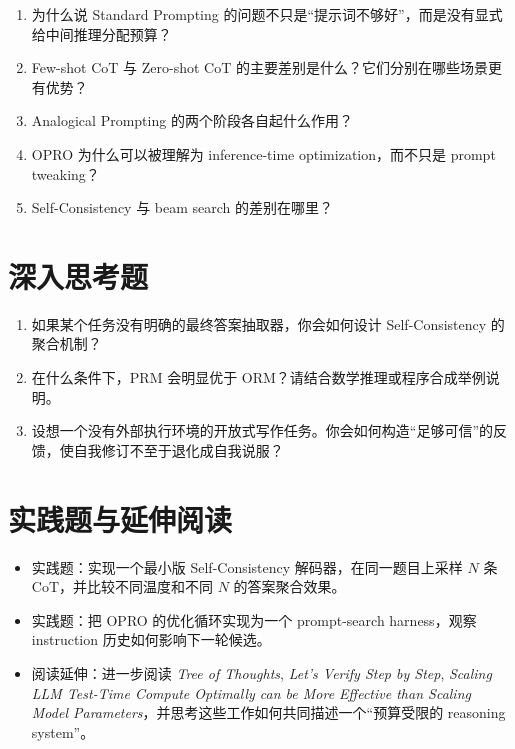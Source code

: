 \documentclass[a4paper]{article}
\begin{document}
\begin{enumerate}
\item 为什么说 Standard Prompting 的问题不只是“提示词不够好”，而是没有显式给中间推理分配预算？
\item Few-shot CoT 与 Zero-shot CoT 的主要差别是什么？它们分别在哪些场景更有优势？
\item Analogical Prompting 的两个阶段各自起什么作用？
\item OPRO 为什么可以被理解为 inference-time optimization，而不只是 prompt tweaking？
\item Self-Consistency 与 beam search 的差别在哪里？
\end{enumerate}

\section{深入思考题}

\begin{enumerate}
\item 如果某个任务没有明确的最终答案抽取器，你会如何设计 Self-Consistency 的聚合机制？
\item 在什么条件下，PRM 会明显优于 ORM？请结合数学推理或程序合成举例说明。
\item 设想一个没有外部执行环境的开放式写作任务。你会如何构造“足够可信”的反馈，使自我修订不至于退化成自我说服？
\end{enumerate}

\section{实践题与延伸阅读}

\begin{itemize}
\item 实践题：实现一个最小版 Self-Consistency 解码器，在同一题目上采样 $N$ 条 CoT，并比较不同温度和不同 $N$ 的答案聚合效果。
\item 实践题：把 OPRO 的优化循环实现为一个 prompt-search harness，观察 instruction 历史如何影响下一轮候选。
\item 阅读延伸：进一步阅读 \emph{Tree of Thoughts}, \emph{Let's Verify Step by Step}, \emph{Scaling LLM Test-Time Compute Optimally can be More Effective than Scaling Model Parameters}，并思考这些工作如何共同描述一个“预算受限的 reasoning system”。
\end{itemize}
\end{document}
